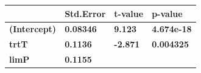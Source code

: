 \documentclass[]{article}
\begin{document}
\begin{longtable}[]{@{}llll@{}}
\toprule
\begin{minipage}[b]{0.43\columnwidth}\raggedright\strut
~
\strut\end{minipage} &
\begin{minipage}[b]{0.17\columnwidth}\raggedright\strut
Std.Error
\strut\end{minipage} &
\begin{minipage}[b]{0.13\columnwidth}\raggedright\strut
t-value
\strut\end{minipage} &
\begin{minipage}[b]{0.16\columnwidth}\raggedright\strut
p-value
\strut\end{minipage}\tabularnewline
\midrule
\endhead
\begin{minipage}[t]{0.43\columnwidth}\raggedright\strut
\textbf{(Intercept)}
\strut\end{minipage} &
\begin{minipage}[t]{0.17\columnwidth}\raggedright\strut
\textbf{0.08346}
\strut\end{minipage} &
\begin{minipage}[t]{0.13\columnwidth}\raggedright\strut
\textbf{9.123}
\strut\end{minipage} &
\begin{minipage}[t]{0.16\columnwidth}\raggedright\strut
\textbf{4.674e-18}
\strut\end{minipage}\tabularnewline
\begin{minipage}[t]{0.43\columnwidth}\raggedright\strut
\textbf{trtT}
\strut\end{minipage} &
\begin{minipage}[t]{0.17\columnwidth}\raggedright\strut
\textbf{0.1136}
\strut\end{minipage} &
\begin{minipage}[t]{0.13\columnwidth}\raggedright\strut
\textbf{-2.871}
\strut\end{minipage} &
\begin{minipage}[t]{0.16\columnwidth}\raggedright\strut
\textbf{0.004325}
\strut\end{minipage}\tabularnewline
\begin{minipage}[t]{0.43\columnwidth}\raggedright\strut
\textbf{limP}
\strut\end{minipage} &
\begin{minipage}[t]{0.17\columnwidth}\raggedright\strut
\textbf{0.1155}
\strut\end{minipage} &
\begin{minipage}[t]{0.13\columnwidth}\raggedright\strut

\end{minipage}
\end{longtable}
\end{document}
